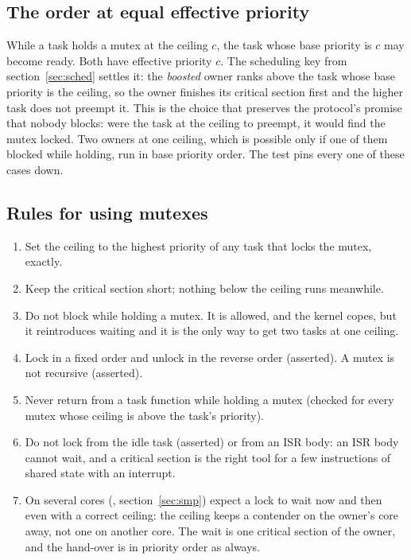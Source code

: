 \subsection{The order at equal effective priority}
\label{sec:tie}

While a task holds a mutex at the ceiling $c$, the task whose base priority is $c$ may
become ready. Both have effective priority $c$. The scheduling key from
section~\ref{sec:sched} settles it: the \emph{boosted} owner ranks above the task whose
base priority is the ceiling, so the owner finishes its critical section first and the
higher task does not preempt it. This is the choice that preserves the protocol's
promise that nobody blocks: were the task at the ceiling to preempt, it would find the
mutex locked. Two owners at one ceiling, which is possible only if one of them blocked
while holding, run in base priority order. The test  pins every
one of these cases down.

\subsection{Rules for using mutexes}

\begin{enumerate}
\item Set the ceiling to the highest priority of any task that locks the mutex, exactly.
\item Keep the critical section short; nothing below the ceiling runs meanwhile.
\item Do not block while holding a mutex. It is allowed, and the kernel copes, but it
  reintroduces waiting and it is the only way to get two tasks at one ceiling.
\item Lock in a fixed order and unlock in the reverse order (asserted). A mutex is not
  recursive (asserted).
\item Never return from a task function while holding a mutex (checked for every mutex
  whose ceiling is above the task's priority).
\item Do not lock from the idle task (asserted) or from an ISR body: an ISR body cannot
  wait, and a critical section is the right tool for a few instructions of shared state
  with an interrupt.
\item On several cores (, section~\ref{sec:smp}) expect a lock to
  wait now and then even with a correct ceiling: the ceiling keeps a contender on the
  owner's core away, not one on another core. The wait is one critical section of the
  owner, and the hand-over is in priority order as always.
\end{enumerate}

